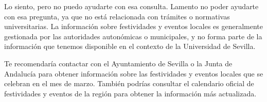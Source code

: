 \documentclass{article}
\begin{document}
\begin{itemize}
\begin{itemize}
                        Lo siento, pero no puedo ayudarte con esa consulta. Lamento no poder ayudarte con esa pregunta, ya que no está relacionada con trámites o normativas universitarias. La información sobre festividades y eventos locales es generalmente gestionada por las autoridades autonómicas o municipales, y no forma parte de la información que tenemos disponible en el contexto de la Universidad de Sevilla.

                        Te recomendaría contactar con el Ayuntamiento de Sevilla o la Junta de Andalucía para obtener información sobre las festividades y eventos locales que se celebran en el mes de marzo. También podrías consultar el calendario oficial de festividades y eventos de la región para obtener la información más actualizada.
            \end{itemize}

\end{itemize}
\end{document}
